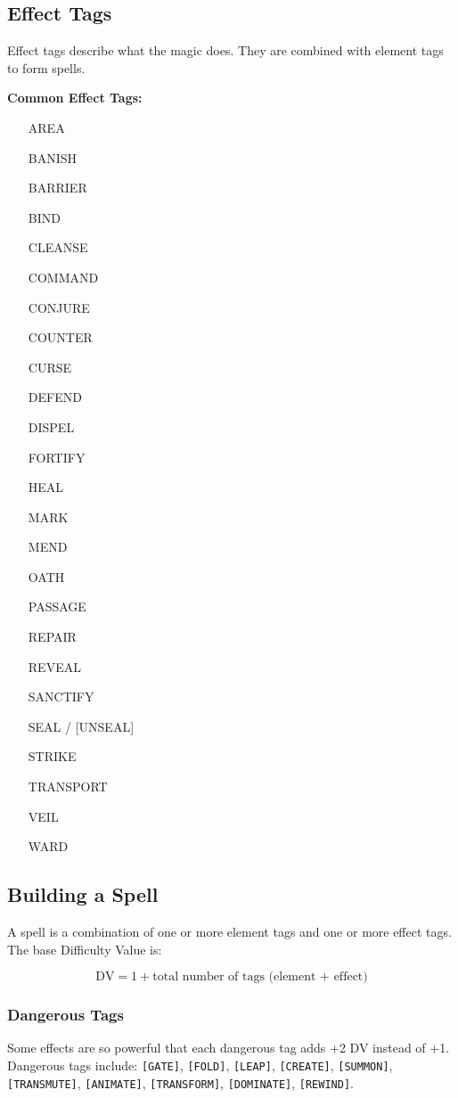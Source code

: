 \subsection{Effect Tags}

Effect tags describe what the magic does. They are combined with element tags to form spells.

\textbf{Common Effect Tags:}
\begin{multicols}{2}
\begin{itemize}
  \item [AREA]
  \item [BANISH]
  \item [BARRIER]
  \item [BIND]
  \item [CLEANSE]
  \item [COMMAND]
  \item [CONJURE]
  \item [COUNTER]
  \item [CURSE]
  \item [DEFEND]
  \item [DISPEL]
  \item [FORTIFY]
  \item [HEAL]
  \item [MARK]
  \item [MEND]
  \item [OATH]
  \item [PASSAGE]
  \item [REPAIR]
  \item [REVEAL]
  \item [SANCTIFY]
  \item [SEAL] / [UNSEAL]
  \item [STRIKE]
  \item [TRANSPORT]
  \item [VEIL]
  \item [WARD]
\end{itemize}
\end{multicols}

\subsection{Building a Spell}

A spell is a combination of one or more element tags and one or more effect tags. The base Difficulty Value is:

\[
\text{DV} = 1 + \text{total number of tags (element + effect)}
\]

\subsubsection{Dangerous Tags}
Some effects are so powerful that each dangerous tag adds +2 DV instead of +1. Dangerous tags include: \texttt{[GATE]}, \texttt{[FOLD]}, \texttt{[LEAP]}, \texttt{[CREATE]}, \texttt{[SUMMON]}, \texttt{[TRANSMUTE]}, \texttt{[ANIMATE]}, \texttt{[TRANSFORM]}, \texttt{[DOMINATE]}, \texttt{[REWIND]}.

